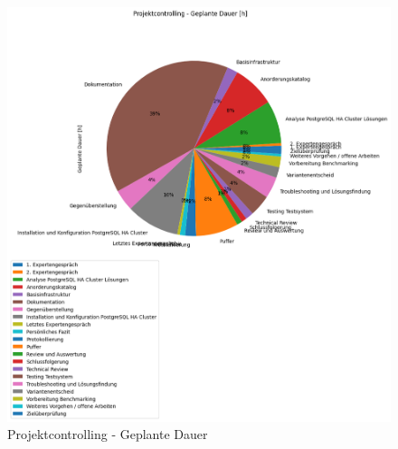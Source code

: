 \begin{flushleft}
\clearpage
{}
\recalctypearea
    \begin{figure}[H]
        \centering
        \includegraphics[width=0.75\linewidth]{source/pandas_data_chart_plotter/projektcontrolling_geplant}
        \caption{Projektcontrolling - Geplante Dauer}
        \label{fig:projektcontrolling_geplant}
    \end{figure}
\end{flushleft}
\clearpage
